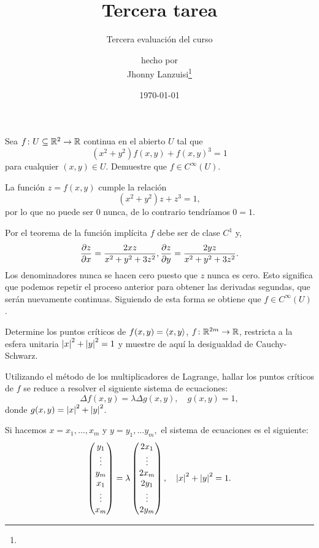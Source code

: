 \documentclass{scrartcl}
\begin{document}
%
\title{Tercera tarea}
\subtitle{Tercera evaluación del curso}
\subject{Análisis III}
\titlehead{Universidad Simón Bolívar\hfill Caracas, Venezuela}
\author{{\normalsize hecho por} \\ Jhonny Lanzuisi\footnote{\mycopyright}}
\date{\today}
\maketitle

\exercise
%
Sea \(f\colon U\subseteq\mathbb{R}^{2}\to\mathbb{R}\) continua en el abierto \(U\)
tal que
\[
(x^2+y^2)f(x,y) + f(x,y)^3 = 1
\]
para cualquier \((x,y)\in U\). Demuestre que \(f\in C^\infty (U)\).

\solution
%
La función \(z = f(x,y)\) cumple la relación
\[
(x^2+y^2)z + z^3 = 1,
\]
por lo que no puede ser 0 nunca, de lo contrario tendríamos
\(0=1\).

Por el teorema de la función implícita \(f\) debe ser
de clase \(C^1\) y,
\[
\frac{\partial z}{\partial x} = \frac{2xz}{x^2+y^2+3z^2},
\frac{\partial z}{\partial y} = \frac{2yz}{x^2+y^2+3z^2}.
\]
Los denominadores nunca se hacen cero puesto que
\(z\) nunca es cero. Esto significa que podemos
repetir el proceso anterior para obtener las derivadas segundas,
que serán nuevamente continuas. Siguiendo de esta forma se obtiene
que \(f\in C^\infty(U)\).

\exercise
%
Determine los puntos críticos de \(f(x,y) = \left\langle x , y \right\rangle\),
\(f\colon\mathbb{R}^{2m}\to\mathbb{R}\), restricta a la esfera unitaria
\(\left\lvert x \right\rvert^2+\left\lvert y \right\rvert^2 = 1\) y muestre de aquí la desigualdad
de Cauchy-Schwarz.

\solution
%
Utilizando el método de los multiplicadores de Lagrange,
hallar los puntos críticos de \(f\) se reduce a resolver
el siguiente sistema de ecuaciones:
\[
\Delta f(x,y) = \lambda\Delta g(x,y), \quad g(x,y) = 1,
\]
donde \(g(x,y) = \left\lvert x \right\rvert^2 + \left\lvert y \right\rvert^2\).

Si hacemos \(x = x_1,\dots, x_m\) y \(y = y_1,\dots y_m,\)
el sistema de ecuaciones es el siguiente:
\[
\begin{pmatrix}
    y_1 \\ \vdots \\ y_m \\ x_1 \\ \vdots \\ x_m
\end{pmatrix}
= \lambda
\begin{pmatrix}
    2x_1 \\ \vdots \\ 2x_m \\ 2y_1 \\ \vdots \\ 2y_m
\end{pmatrix}
, \quad
\left\lvert x \right\rvert^2+\left\lvert y \right\rvert^2 = 1.
\]
\end{document}
